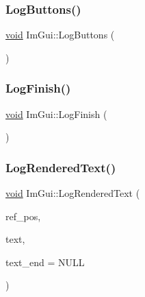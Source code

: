 \mbox{\label{namespaceImGui_a7bd295da4be19bab98262c76fcaeb4fb}} 
\subsubsection{\texorpdfstring{Log\+Buttons()}{LogButtons()}}
{\footnotesize\ttfamily \hyperlink{imgui__impl__opengl3__loader_8h_ac668e7cffd9e2e9cfee428b9b2f34fa7}{void} Im\+Gui\+::\+Log\+Buttons (\begin{DoxyParamCaption}{ }\end{DoxyParamCaption})}

\mbox{\label{namespaceImGui_a2ebcd048d1ca025fb972e1c2e920e3f3}} 
\subsubsection{\texorpdfstring{Log\+Finish()}{LogFinish()}}
{\footnotesize\ttfamily \hyperlink{imgui__impl__opengl3__loader_8h_ac668e7cffd9e2e9cfee428b9b2f34fa7}{void} Im\+Gui\+::\+Log\+Finish (\begin{DoxyParamCaption}{ }\end{DoxyParamCaption})}

\mbox{\label{namespaceImGui_a7a0d62e33f2236ec2f789e24ca0fb56f}} 
\subsubsection{\texorpdfstring{Log\+Rendered\+Text()}{LogRenderedText()}}
{\footnotesize\ttfamily \hyperlink{imgui__impl__opengl3__loader_8h_ac668e7cffd9e2e9cfee428b9b2f34fa7}{void} Im\+Gui\+::\+Log\+Rendered\+Text (\begin{DoxyParamCaption}\item[{const \hyperlink{structImVec2}{Im\+Vec2} $\ast$}]{ref\+\_\+pos,  }\item[{const char $\ast$}]{text,  }\item[{const char $\ast$}]{text\+\_\+end = {\ttfamily NULL} }\end{DoxyParamCaption})}

